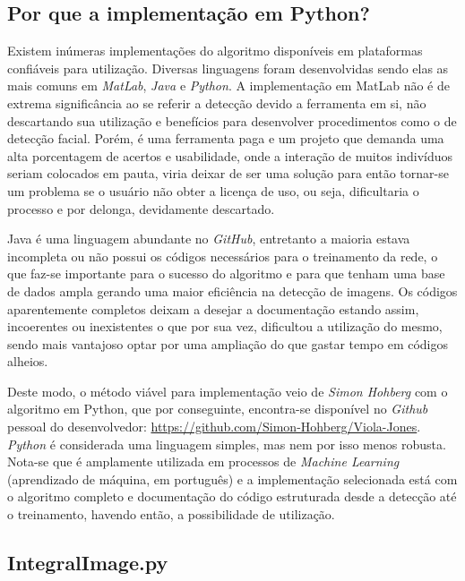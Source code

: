 \documentclass[12pt,a4paper]{article}
\begin{document}
\subsection{Por que a implementação em Python?}
	Existem inúmeras implementações do algoritmo disponíveis em plataformas confiáveis para utilização. Diversas linguagens foram desenvolvidas sendo elas as mais comuns em \textit{MatLab}, \textit{Java} e \textit{Python}. A implementação em MatLab não é de extrema significância ao se referir a detecção devido a ferramenta em si, não descartando sua utilização e benefícios para desenvolver procedimentos como o de detecção facial. Porém, é uma ferramenta paga e um projeto que demanda uma alta porcentagem de acertos e usabilidade, onde a interação de muitos indivíduos seriam colocados em pauta, viria deixar de ser uma solução para então tornar-se um problema se o usuário não obter a licença de uso, ou seja, dificultaria o processo e por delonga, devidamente descartado.  

	Java é uma linguagem abundante no \textit{GitHub}, entretanto a maioria estava incompleta ou não possui os códigos necessários para o treinamento da rede, o que faz-se importante para o sucesso do algoritmo e para que tenham uma base de dados ampla gerando uma maior eficiência na detecção de imagens. Os códigos aparentemente completos deixam a desejar a documentação estando assim, incoerentes ou inexistentes o que por sua vez, dificultou a utilização do mesmo, sendo mais vantajoso optar por uma ampliação do que gastar tempo em códigos alheios. 

	Deste modo, o método viável para implementação veio de \textit{Simon Hohberg} com o algoritmo em Python, que por conseguinte, encontra-se disponível no \textit{Github} pessoal do desenvolvedor:
\url{https://github.com/Simon-Hohberg/Viola-Jones}. \textit{Python} é considerada uma linguagem simples, mas nem por isso menos robusta. Nota-se que é amplamente utilizada em processos de \textit{Machine Learning} (aprendizado de máquina, em português) e a implementação selecionada está com o algoritmo completo e documentação do código estruturada desde a detecção até o treinamento, havendo então, a possibilidade de utilização. 



\subsection{IntegralImage.py}


 
 
\end{document}
